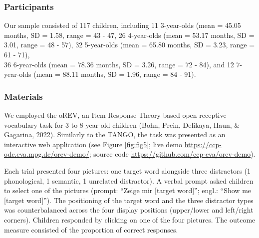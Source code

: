 \documentclass[
  man,floatsintext]{apa6}
\begin{document}
\hypertarget{participants-1}{%
\subsubsection{Participants}\label{participants-1}}

Our sample consisted of 117 children, including 11 3-year-olds (mean = 45.05 months, SD = 1.58, range = 43 - 47,
26 4-year-olds (mean = 53.17 months, SD = 3.01, range = 48 - 57),
32 5-year-olds (mean = 65.80 months, SD = 3.23, range = 61 - 71),\\
36 6-year-olds (mean = 78.36 months, SD = 3.26, range = 72 - 84), and 12 7-year-olds (mean = 88.11 months, SD = 1.96, range = 84 - 91).

\hypertarget{materials}{%
\subsubsection{Materials}\label{materials}}

We employed the oREV, an Item Response Theory based open receptive vocabulary task for 3 to 8-year-old children (Bohn, Prein, Delikaya, Haun, \& Gagarina, 2022). Similarly to the TANGO, the task was presented as an interactive web application (see Figure \ref{fig:fig5}; live demo \url{https://ccp-odc.eva.mpg.de/orev-demo/}; source code \url{https://github.com/ccp-eva/orev-demo}).

Each trial presented four pictures: one target word alongside three distractors (1 phonological, 1 semantic, 1 unrelated distractor). A verbal prompt asked children to select one of the pictures (prompt: ``Zeige mir {[}target word{]}''; engl.: ``Show me {[}target word{]}''). The positioning of the target word and the three distractor types was counterbalanced across the four display positions (upper/lower and left/right corners). Children responded by clicking on one of the four pictures. The outcome measure consisted of the proportion of correct responses.
\end{document}

